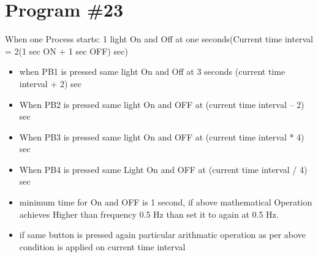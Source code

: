 \documentclass[
	12pt, %
]{fphw}
\begin{document}
\section*{Program \#23}
\begin{problem}
 When one Process starts: 1 light On and Off at one seconds(Current time interval = 2(1 sec ON + 1 sec OFF) sec) \medskip
\begin{itemize}
\item when PB1 is pressed same light On and Off at 3 seconds (current time interval + 2) sec
\item When PB2 is pressed same light On and OFF at (current time interval – 2) sec
\item When PB3 is pressed same light On and OFF at (current time interval * 4) sec
\item When PB4 is pressed same Light On and OFF at (current time interval / 4) sec
\item minimum time for On and OFF is 1 second, if above mathematical Operation
  achieves Higher than frequency 0.5 Hz than set it to again at 0.5 Hz.
\item if same button is pressed again particular arithmatic operation as per
  above condition is applied on current time interval
\end{itemize}
\end{problem}
\end{document}
